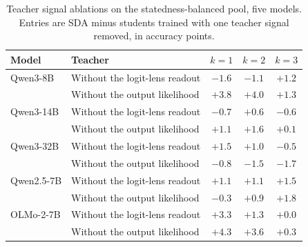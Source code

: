 \begin{table}[t]
\centering
\caption{Teacher signal ablations on the statedness-balanced pool, five models. Entries are SDA minus
students trained with one teacher signal removed, in accuracy points.}
\label{tab:teachermodelpaired}
\small
\setlength{\tabcolsep}{4pt}
\begin{tabular}{llccc}
\toprule
Model & Teacher & $k=1$ & $k=2$ & $k=3$ \\
\midrule
Qwen3-8B & Without the logit-lens readout & $-1.6$ & $-1.1$ & $+1.2$ \\
 & Without the output likelihood & $+3.8$ & $+4.0$ & $+1.3$ \\
Qwen3-14B & Without the logit-lens readout & $-0.7$ & $+0.6$ & $-0.6$ \\
 & Without the output likelihood & $+1.1$ & $+1.6$ & $+0.1$ \\
Qwen3-32B & Without the logit-lens readout & $+1.5$ & $+1.0$ & $-0.5$ \\
 & Without the output likelihood & $-0.8$ & $-1.5$ & $-1.7$ \\
Qwen2.5-7B & Without the logit-lens readout & $+1.1$ & $+1.1$ & $+1.5$ \\
 & Without the output likelihood & $-0.3$ & $+0.9$ & $+1.8$ \\
OLMo-2-7B & Without the logit-lens readout & $+3.3$ & $+1.3$ & $+0.0$ \\
 & Without the output likelihood & $+4.3$ & $+3.6$ & $+0.3$ \\
\bottomrule
\end{tabular}
\end{table}
